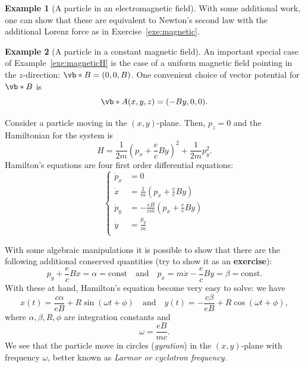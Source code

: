 \documentclass[english,fontsize=11pt,paper=b5]{scrbook}
\numberwithin{equation}{chapter}
\theoremstyle{definition}
\newtheorem{example}{Example}[chapter]
\begin{document}
\begin{example}[A particle in an electromagnetic field]
      With some additional work, one can show that these are equivalent to Newton's second law with the additional Lorenz force as in Exercise~\ref{exe:magnetic}.
    \end{example}

    \begin{example}[A particle in a constant magnetic field]
      An important special case of Example~\ref{exe:magneticH} is the case of a uniform magnetic field pointing in the $z$-direction: $\vb* B = (0,0,B)$.
      One convenient choice of vector potential for $\vb* B$ is
      \begin{equation}
        \vb* A (x,y,z) = (-B y, 0, 0).
      \end{equation}

      Consider a particle moving in the $(x, y)$-plane.
      Then, $p_z = 0$ and the Hamiltonian for the system is
      \begin{equation}
        H = \frac1{2m}\left(p_x + \frac ec By\right)^2 + \frac1{2m}p_y^2.
      \end{equation}
      Hamilton's equations are four first order differential equations:
      \begin{equation}\label{eq:magHeq}
        \left\lbrace
          \begin{aligned}
            \dot p_x & = 0                                             \\
            \dot x   & = \frac1m\left(p_x + \frac ec By\right)         \\
            \dot p_y & = -\frac{eB}{cm} \left(p_x + \frac ec By\right) \\
            \dot y   & = \frac {p_y} m                                 \\
          \end{aligned}
        \right.
      \end{equation}

      With some algebraic manipulations it is possible to show that there are the following additional conserved quantities (try to show it as an \textbf{exercise}):
      \begin{equation}
        p_y + \frac ec Bx = \alpha = \mathrm{const} \quad\mbox{and}\quad
        p_x = m\dot x - \frac ec By = \beta = \mathrm{const}.
      \end{equation}
      With these at hand, Hamilton's equation become very easy to solve: we have
      \begin{equation}
        x(t) = \frac {c \alpha}{e B} + R \sin(\omega t + \phi)
        \quad\mbox{and}\quad
        y(t) = -\frac {c \beta}{e B} + R \cos(\omega t + \phi),
      \end{equation}
      where $\alpha, \beta, R, \phi$ are integration constants and
      \begin{equation}
        \omega = \frac{e B}{m c}.
      \end{equation}
      We see that the particle move in circles (\emph{gyration}) in the $(x,y)$-plane with frequency $\omega$, better known as \emph{Larmor or cyclotron frequency}.


\end{example}
\end{document}
